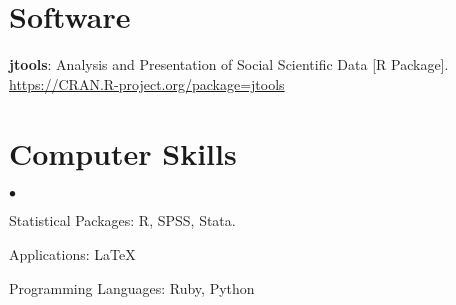 \documentclass[margin,line]{res}
\newenvironment{list2}{
  \begin{list}{$\bullet$}{%
      \setlength{\itemsep}{0in}
      \setlength{\parsep}{0in} \setlength{\parskip}{0in}
      \setlength{\topsep}{0in} \setlength{\partopsep}{0in} 
      \setlength{\leftmargin}{0.2in}}}{\end{list}}
\begin{document}
\begin{resume}


\section{\sc Software} 

\textbf{jtools}: Analysis and Presentation of Social Scientific Data [R Package]. \url{https://CRAN.R-project.org/package=jtools}

\section{\sc Computer Skills} 
\begin{list2}
\item Statistical Packages:  R, SPSS, Stata.
\item Applications: \LaTeX
\item Programming Languages: Ruby, Python\\ 
\end{list2}



\end{resume}
\end{document}
